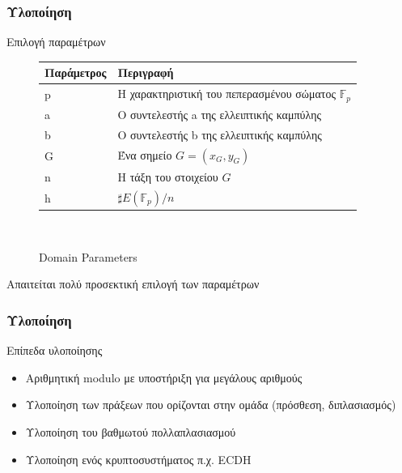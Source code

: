 \documentclass{beamer}
\begin{document}
%
\begin{frame}
\frametitle{Υλοποίηση}
\begin{block}
{Επιλογή παραμέτρων}
\begin{figure}[!htbp]
\begin{center}
\begin{tabular}{|l|l|} \hline
\textbf{Παράμετρος} & \textbf{Περιγραφή} \\ \hline
p & Η χαρακτηριστική του πεπερασμένου σώματος $\mathbb{F}_p$ \\ \hline
a & Ο συντελεστής a της ελλειπτικής καμπύλης \\ \hline
b & Ο συντελεστής b της ελλειπτικής καμπύλης \\ \hline
G & Ένα σημείο $G = (x_G, y_G)$  \\ \hline
n & Η τάξη του στοιχείου $G$ \\ \hline
h & $\sharp E(\mathbb{F}_p)/n$ \\ \hline
\end{tabular} \\
\end{center}
\caption{Domain Parameters}
\end{figure}
\alert{Απαιτείται πολύ προσεκτική επιλογή των παραμέτρων} \cite{ECDSA} \cite{SEC2} \cite{BPOOL}
\end{block}
\end{frame}

%
\begin{frame}
\frametitle{Υλοποίηση}
\begin{block}
{Επίπεδα υλοποίησης}
\begin{itemize}
\item Αριθμητική modulo με υποστήριξη για μεγάλους αριθμούς
\item Υλοποίηση των πράξεων που ορίζονται στην ομάδα (πρόσθεση, διπλασιασμός)
\item Υλοποίηση του βαθμωτού πολλαπλασιασμού
\item Υλοποίηση ενός κρυπτοσυστήματος π.χ. ECDH 
\end{itemize}
\end{block}
\end{frame}
\end{document}
